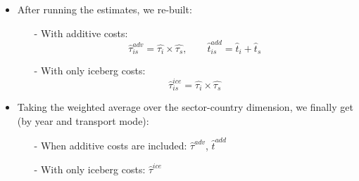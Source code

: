 \documentclass[10 pt,Helvetica, french]{beamer}
\begin{document}
\begin{frame}
\begin{itemize}
\item After running the estimates, we re-built: \vspace{0.1cm}
\begin{itemize}
\item[-] With additive costs:
$$\widehat{\tau}^{adv}_{is} = \widehat{\tau_{i}} \times \widehat{\tau_{s}}, \qquad \widehat{t}^{add}_{is} = \widehat{t}_{i} + \widehat{t}_{s}$$
\item[-] With only iceberg costs:
$$\widehat{\tau}^{ice}_{is} = \widehat{\tau_{i}} \times \widehat{\tau_{s}}$$
\end{itemize}
\item  Taking the weighted average over the sector-country dimension, we finally get (by year and transport mode): \vspace{0.1cm}
\begin{itemize}
\item[-] When additive costs are included: $\widehat{\tau}^{adv}$, $\widehat{t}^{add}$  \vspace{0.1cm}
\item[-] With only iceberg costs: $\widehat{\tau}^{ice}$
\end{itemize}
\end{itemize}
\end{frame}
\end{document}
